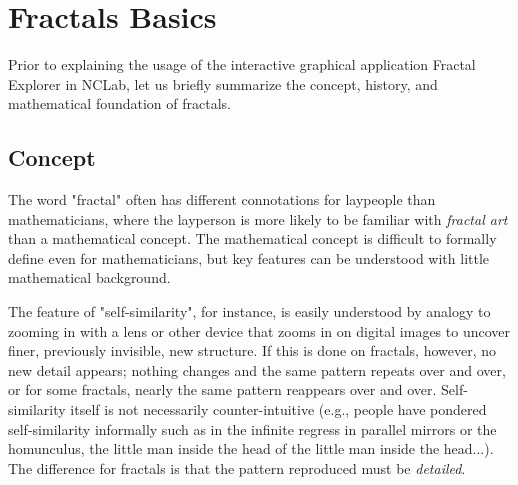 \documentclass{article}
\begin{document}

\normalsize

\newpage
\setcounter{tocdepth}{2}
\tableofcontents

\newpage

\pagestyle{plain}
\setcounter{page}{1}


\newpage

\pagestyle{plain}

\section{Fractals Basics}

Prior to explaining the usage of the interactive graphical application 
Fractal Explorer in NCLab, let us briefly summarize the concept, history, 
and mathematical foundation of fractals.

\subsection{Concept}

The word "fractal" often has different connotations for laypeople than mathematicians, where 
the layperson is more likely to be familiar with {\em fractal art} than a mathematical concept. 
The mathematical concept is difficult to formally define even for mathematicians, but key 
features can be understood with little mathematical background.

The feature of "self-similarity", for instance, is easily understood by analogy to zooming in 
with a lens or other device that zooms in on digital images to uncover finer, previously 
invisible, new structure. If this is done on fractals, however, no new detail appears; 
nothing changes and the same pattern repeats over and over, or for some fractals, nearly 
the same pattern reappears over and over. Self-similarity itself is not necessarily counter-intuitive 
(e.g., people have pondered self-similarity informally such as in the infinite regress in 
parallel mirrors or the homunculus, the little man inside the head of the little man inside 
the head...). The difference for fractals is that the pattern reproduced must be {\em detailed}.
\end{document}
